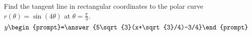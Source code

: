 \documentclass{ximera}
\author{Gregory Hartman \and Matthew Carr}
\begin{document}
\begin{exercise}





Find the tangent line in rectangular coordinates to the polar curve $r(\theta)=\sin(4\theta)$ at $\theta=\frac{\pi}{3}$. 
 \[
y\begin{prompt}=\answer{5\sqrt{3}(x+\sqrt{3}/4)-3/4}\end{prompt}
 \]      
 
\end{exercise}
\end{document}
